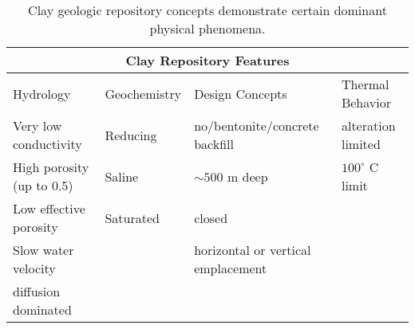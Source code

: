 %
\begin{table}[h!]
  \centering
  \footnotesize{
  \begin{tabularx}{\textwidth}{|X|X|X|X|}
    \multicolumn{4}{c}{\textbf{Clay Repository Features}}\\
    \hline
     Hydrology & Geochemistry & Design Concepts & Thermal Behavior \\ 
    \hline
    Very low conductivity&Reducing&no/bentonite/concrete backfill &alteration limited\\
    High porosity (up to 0.5)&Saline&$\sim500$ m deep&$100^\circ$ C limit \\
    Low effective porosity&Saturated&closed&\\
    Slow water velocity &&horizontal or vertical emplacement&\\
    diffusion dominated &&&\\
    \hline
  \end{tabularx}
  \caption[Clay repository features.]{Clay geologic repository 
  concepts demonstrate certain dominant physical phenomena. }
  \label{tab:clay_tab}
  }
\end{table}


